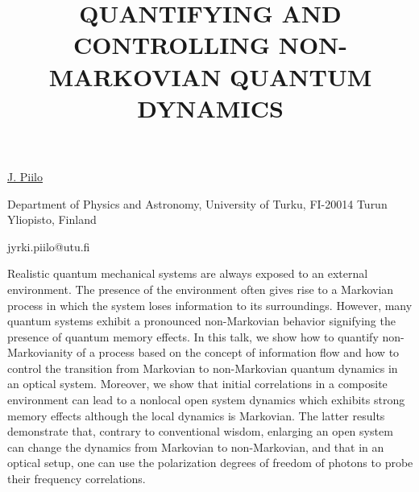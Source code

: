 \title{QUANTIFYING AND CONTROLLING NON-MARKOVIAN QUANTUM DYNAMICS}

\underline{J. Piilo}

{\normalsize{\vspace{-4mm}
Department of Physics and Astronomy,
University of Turku,
FI-20014 Turun Yliopisto,
Finland

\email jyrki.piilo@utu.fi}}

Realistic quantum mechanical systems are always exposed to an external environment. The presence of the environment often gives
rise to a Markovian process in which the system loses information to its surroundings. However, many quantum systems exhibit a
pronounced non-Markovian behavior signifying the presence of quantum memory effects. In this talk, we show how to quantify
non-Markovianity of a process based on the concept of information flow  and how to control the transition from Markovian to
non-Markovian quantum dynamics in an optical system. Moreover, we show that initial correlations in a composite environment can lead
to a nonlocal open system dynamics which exhibits strong memory effects although the local dynamics is Markovian. The latter
results demonstrate that, contrary to conventional wisdom, enlarging an open system can change the dynamics from Markovian to
non-Markovian, and that in an optical setup, one can use the polarization degrees of freedom of photons to probe their frequency
correlations.

\vspace{\baselineskip} 